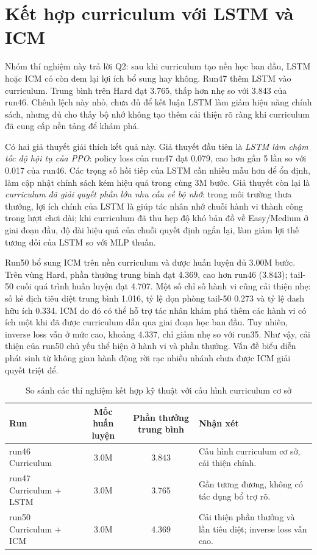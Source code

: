 \section{Kết hợp curriculum với LSTM và ICM}
\label{sec:curriculum_combinations}

Nhóm thí nghiệm này trả lời Q2: sau khi curriculum tạo nền học ban đầu, LSTM hoặc ICM có còn đem lại lợi ích bổ sung hay không. Run47 thêm LSTM vào curriculum. Trung bình trên Hard đạt 3.765, thấp hơn nhẹ so với 3.843 của run46. Chênh lệch này nhỏ, chưa đủ để kết luận LSTM làm giảm hiệu năng chính sách, nhưng đủ cho thấy bộ nhớ không tạo thêm cải thiện rõ ràng khi curriculum đã cung cấp nền tảng để khám phá.

Có hai giả thuyết giải thích kết quả này. Giả thuyết đầu tiên là \textit{LSTM làm chậm tốc độ hội tụ của PPO}: policy loss của run47 đạt 0.079, cao hơn gần 5 lần so với 0.017 của run46. Các trọng số hồi tiếp của LSTM cần nhiều mẫu hơn để ổn định, làm cập nhật chính sách kém hiệu quả trong cùng 3M bước. Giả thuyết còn lại là \textit{curriculum đã giải quyết phần lớn nhu cầu về bộ nhớ}: trong môi trường thưa thưởng, lợi ích chính của LSTM là giúp tác nhân nhớ chuỗi hành vi thành công trong lượt chơi dài; khi curriculum đã thu hẹp độ khó bản đồ về Easy/Medium ở giai đoạn đầu, độ dài hiệu quả của chuỗi quyết định ngắn lại, làm giảm lợi thế tương đối của LSTM so với MLP thuần.

Run50 bổ sung ICM trên nền curriculum và được huấn luyện đủ 3.00M bước. Trên vùng Hard, phần thưởng trung bình đạt 4.369, cao hơn run46 (3.843); tail-50 cuối quá trình huấn luyện đạt 4.707. Một số chỉ số hành vi cũng cải thiện nhẹ: số kẻ địch tiêu diệt trung bình 1.016, tỷ lệ dọn phòng tail-50 0.273 và tỷ lệ dash hữu ích 0.334. ICM do đó có thể hỗ trợ tác nhân khám phá thêm các hành vi có ích một khi đã được curriculum dẫn qua giai đoạn học ban đầu. Tuy nhiên, inverse loss vẫn ở mức cao, khoảng 4.337, chỉ giảm nhẹ so với run35. Như vậy, cải thiện của run50 chủ yếu thể hiện ở hành vi và phần thưởng. Vấn đề biểu diễn phát sinh từ không gian hành động rời rạc nhiều nhánh chưa được ICM giải quyết triệt để.

\begin{table}[H]
    \centering
    \small
    \caption{So sánh các thí nghiệm kết hợp kỹ thuật với cấu hình curriculum cơ sở}
    \label{tab:stacking_tests}
    \begin{tabular}{|p{3.5cm}|c|c|p{4.2cm}|}
        \hline
        \textbf{Run} & \textbf{Mốc huấn luyện} & \textbf{Phần thưởng trung bình} & \textbf{Nhận xét} \\
        \hline
        run46 Curriculum & 3.0M & 3.843 & Cấu hình curriculum cơ sở, cải thiện chính. \\
        \hline
        run47 Curriculum + LSTM & 3.0M & 3.765 & Gần tương đương, không có tác dụng bổ trợ rõ. \\
        \hline
        run50 Curriculum + ICM & 3.0M & 4.369 & Cải thiện phần thưởng và lần tiêu diệt; inverse loss vẫn cao. \\
        \hline
    \end{tabular}
\end{table}

